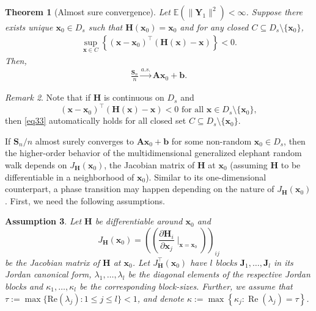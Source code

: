 \documentclass[12pt]{amsart}
\theoremstyle{plain}
\newtheorem{theorem}{Theorem}[section]
\newtheorem{assumption}[theorem]{Assumption}
\theoremstyle{remark}
\newtheorem{remark}[theorem]{Remark}
\numberwithin{equation}{section}
\begin{document}
\begin{theorem}[Almost sure convergence]\label{thm:slln-gerw}
Let $\mathbb{E}\left(\|\boldsymbol{Y}_1\|^2\right) < \infty$. Suppose there exists unique $\boldsymbol{x}_0 \in D_s$ such that $\boldsymbol{H}(\boldsymbol{x}_0) = \boldsymbol{x}_0$ 
and for any closed $C \subseteq D_s\setminus \{\boldsymbol{x}_0\}$, 
\begin{align}\label{eq33}
    \sup_{\boldsymbol{x} \in C} \left\{(\boldsymbol{x}-\boldsymbol{x}_0)^{\top}\left(\boldsymbol{H}(\boldsymbol{x}) - \boldsymbol{x}\right)\right\} < 0.
\end{align}
Then, 
\begin{align}\label{eq:asconv1}
   \frac{\boldsymbol{S}_n}{n} \stackrel{a.s.}{\to} \boldsymbol{A}\boldsymbol{x}_0 + \boldsymbol{b}.
\end{align}
\end{theorem}

\begin{remark}  
Note that if $\boldsymbol{H}$ is continuous on $D_s$ and 
\[
   (\boldsymbol{x}-\boldsymbol{x}_0)^{\top}\left(\boldsymbol{H}(\boldsymbol{x}) - \boldsymbol{x}\right) < 0 \text{ for all } \boldsymbol{x} \in D_s \setminus \{\boldsymbol{x}_0\},
\]
then \eqref{eq33} automatically holds for all closed set $C \subseteq D_s\setminus \{\boldsymbol{x}_0\}$.    
\end{remark}

If ${\boldsymbol{S}_n}/{n}$ almost surely converges to $\boldsymbol{A}\boldsymbol{x}_0 + \boldsymbol{b}$ for some non-random $\boldsymbol{x}_0 \in {D}_s$, then the higher-order behavior of the multidimensional generalized elephant random walk depends on $J_{\boldsymbol{H}}(\boldsymbol{x}_0)$, the Jacobian matrix of $\boldsymbol{H}$ at $\boldsymbol{x}_0$ (assuming $\boldsymbol{H}$ to be differentiable in a neighborhood of $\boldsymbol{x}_0$). Similar to its one-dimensional counterpart, a phase transition may happen depending on the nature of $J_{\boldsymbol{H}}(\boldsymbol{x}_0)$. First, we need the following assumptions.

\begin{assumption}\label{clt:assump1}
    Let $\boldsymbol{H}$ be differentiable %
    around $\boldsymbol{x}_0$ and \[J_{\boldsymbol{H}}(\boldsymbol{x}_0) = \left(\left(\frac{\partial \boldsymbol{H}_i}{\partial \boldsymbol{x}_j}\mid _{\boldsymbol{x} = \boldsymbol{x}_0}\right)\right)_{ij}\] be the Jacobian matrix of $\boldsymbol{H}$ at $\boldsymbol{x}_0$. Let $J^{\top}_{\boldsymbol{H}}(\boldsymbol{x}_0)$ have $l$ blocks $\boldsymbol{J}_1, \ldots, \boldsymbol{J}_l$ in its Jordan canonical form, $\lambda_1, \ldots, \lambda_l$ be the diagonal elements of the respective Jordan blocks and $\kappa_1, \ldots, \kappa_l$ be the corresponding block-sizes.
    Further, we assume that $\tau := \max \{ \text{Re}(\lambda_j) : 1 \leq j \leq l \} < 1$, and denote $\kappa := \max \left\{\kappa_j : \operatorname{Re}\left(\lambda_j\right) = \tau\right\}$.
\end{assumption}
\end{document}
